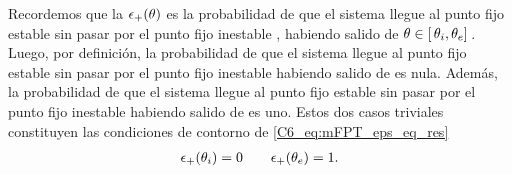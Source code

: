 \documentclass[./main.tex]{subfiles}
\begin{document}
Recordemos que la $\epsilon_{+}(\theta)$ es la probabilidad de que el sistema llegue al punto fijo estable \xxe sin pasar por el punto fijo inestable \xxi, habiendo salido de $ \theta  \in [ \,\theta_i,\theta_e ]\,$. Luego, por definición, la probabilidad de que el sistema llegue al punto fijo estable \xxe sin pasar por el punto fijo inestable \xxi habiendo salido de \xxi es nula. Además, la probabilidad de que el sistema llegue al punto fijo estable \xxe sin pasar por el punto fijo inestable \xxi habiendo salido de \xxe es uno. Estos dos casos triviales constituyen las condiciones de contorno de \ref{C6_eq:mFPT_eps_eq_res}
\begin{align}
    \epsilon_{+}(\theta_i) = 0 \qquad \epsilon_{+}(\theta_e) = 1.
    \label{C6_eq:mFPT_eps_cdc}
\end{align}
\end{document}

